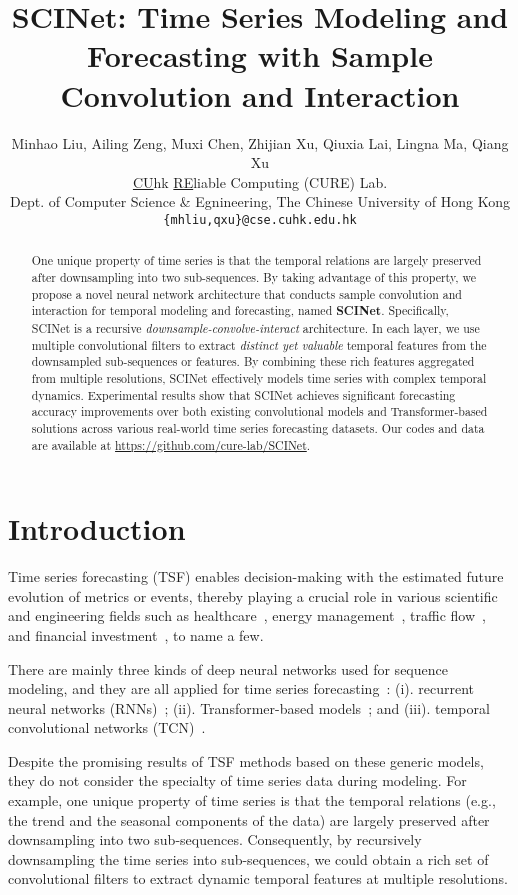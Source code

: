 \documentclass{article}
\title{SCINet: Time Series Modeling and Forecasting with Sample Convolution and Interaction}
\author{Minhao Liu,  Ailing Zeng, Muxi Chen, Zhijian Xu, Qiuxia Lai, Lingna Ma, Qiang Xu \\
\underline{CU}hk \underline{RE}liable Computing (CURE) Lab.\\
Dept. of Computer Science \& Egnineering, The Chinese University of Hong Kong\\
\texttt{\{mhliu,qxu\}@cse.cuhk.edu.hk} \\
}
\begin{document}
\maketitle

\begin{abstract}
One unique property of time series is that the temporal relations are largely preserved after downsampling into two sub-sequences. By taking advantage of this property, we propose a novel neural network architecture that conducts sample convolution and interaction for temporal modeling and forecasting, named \textbf{SCINet}. Specifically, SCINet is a recursive \emph{downsample-convolve-interact} architecture. In each layer, we use multiple convolutional filters to extract \emph{distinct yet valuable} temporal features from the downsampled sub-sequences or features. By combining these rich features aggregated from multiple resolutions, SCINet effectively models time series with complex temporal dynamics. Experimental results show that SCINet achieves significant forecasting accuracy improvements over both existing convolutional models and Transformer-based solutions across various real-world time series forecasting datasets. Our codes and data are available at \url{https://github.com/cure-lab/SCINet}.
\end{abstract}



\section{Introduction}
Time series forecasting (TSF) enables decision-making with the estimated future evolution of metrics or events, thereby playing a crucial role in various scientific and engineering fields such as healthcare~\citep{Bahadori2019TemporalClusteringII}, energy management~\citep{Zhou2020InformerBE}, traffic flow~\citep{Zhou2020InformerBE}, and financial investment~\citep{DUrso2019TrimmedFC}, to name a few.

There are mainly three kinds of deep neural networks used for sequence modeling, and they are all applied for time series forecasting~\citep{Lim2021TimeseriesFW}: (i). recurrent neural networks (RNNs)~\citep{Hochreiter1997LongSM}; (ii). Transformer-based models~\citep{vaswani2017attention}; and (iii). temporal convolutional networks (TCN)~\citep{Bai2018AnEE}.

Despite the promising results of TSF methods based on these generic models, they do not consider the specialty of time series data during modeling.
For example, one unique property of time series is that the temporal relations (e.g., the trend and the seasonal components of the data) are largely preserved after downsampling into two sub-sequences. Consequently, by recursively downsampling the time series into sub-sequences, we could obtain a rich set of convolutional filters to extract dynamic temporal features at multiple resolutions. 
\end{document}
